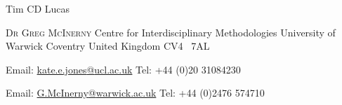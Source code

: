 \documentclass{scrartcl}
\begin{document}
\begin{cv}{Tim {\Large CD} Lucas}
\begin{multicols}{2}
\begin{footnotesize}
\vfill
\columnbreak
\textsc{Dr Greg McInerny}\newline
Centre for Interdisciplinary Methodologies\newline
University of Warwick\newline
Coventry\newline
United Kingdom\newline
{\scriptsize CV}4 \ {\scriptsize 7AL}

\end{footnotesize}
\end{multicols}
\vspace{-0.5cm}
\begin{multicols}{2}
\begin{footnotesize}
Email: \href{mailto:kate.e.jones@ucl.ac.uk}{kate.e.jones{\scriptsize @}ucl.ac.uk}\newline
Tel: +44 (0)20 31084230
\columnbreak

Email: \href{mailto:g.mcinerny@warwick.ac.uk}{G.McInerny{\scriptsize @}warwick.ac.uk}\vspace{-0.8mm}\newline
Tel: +44 (0)2476 574710
\end{footnotesize}
\end{multicols}




\end{cv}
\end{document}
